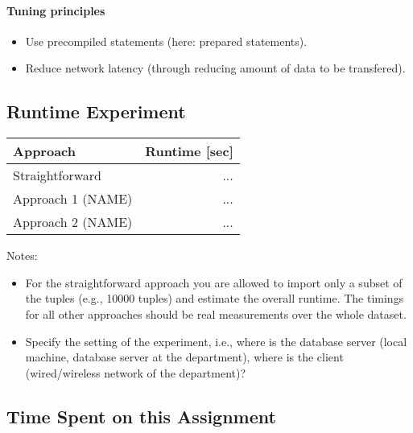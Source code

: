 \documentclass[11pt]{scrartcl}
\begin{document}
  \paragraph{Tuning principles}
  \begin{itemize}
  	\item Use precompiled statements (here: prepared statements).
  	\item Reduce network latency (through reducing amount of data to be transfered).
  \end{itemize}

  \subsection*{Runtime Experiment}
  \begin{table}[H]
  \begin{tabular}{l|r}
    Approach & Runtime [sec] \\
    \hline
    Straightforward & ... \\
    Approach 1 (NAME) & ... \\
    Approach 2 (NAME) & ...
  \end{tabular}
  \end{table}

  \bigskip

  \noindent Notes:
  \begin{itemize}
  \item For the straightforward approach you are allowed to import
    only a subset of the tuples (e.g., 10000 tuples) and estimate the
    overall runtime. The timings for all other approaches should be
    real measurements over the whole dataset.
  \item Specify the setting of the experiment, i.e., where is the
    database server (local machine, database server at the
    department), where is the client (wired/wireless network of the
    department)?
\end{itemize}

  \subsection*{Time Spent on this Assignment}

\end{document}
